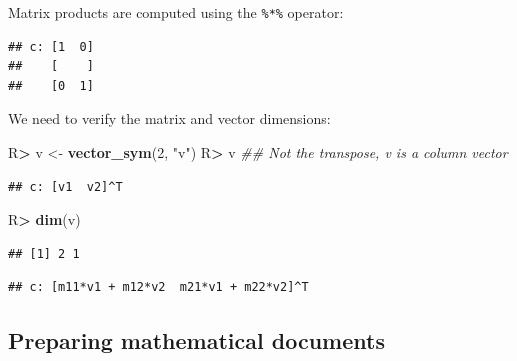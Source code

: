 \documentclass[10pt,]{article}
\newenvironment{Shaded}{\begin{snugshade}}{\end{snugshade}}
\newcommand{\CommentTok}[1]{\textcolor[rgb]{0.56,0.35,0.01}{\textit{#1}}}
\newcommand{\DecValTok}[1]{\textcolor[rgb]{0.00,0.00,0.81}{#1}}
\newcommand{\KeywordTok}[1]{\textcolor[rgb]{0.13,0.29,0.53}{\textbf{#1}}}
\newcommand{\NormalTok}[1]{#1}
\newcommand{\OperatorTok}[1]{\textcolor[rgb]{0.81,0.36,0.00}{\textbf{#1}}}
\newcommand{\StringTok}[1]{\textcolor[rgb]{0.31,0.60,0.02}{#1}}
\begin{document}
Matrix products are computed using the \texttt{\%*\%} operator:

\begin{Shaded}
\end{Shaded}

\begin{verbatim}
## c: [1  0]
##    [    ]
##    [0  1]
\end{verbatim}

We need to verify the matrix and vector dimensions:

\begin{Shaded}
\begin{Highlighting}[]
\NormalTok{R}\OperatorTok{>}\StringTok{ }\NormalTok{v <-}\StringTok{ }\KeywordTok{vector_sym}\NormalTok{(}\DecValTok{2}\NormalTok{, }\StringTok{"v"}\NormalTok{)}
\NormalTok{R}\OperatorTok{>}\StringTok{ }\NormalTok{v }\CommentTok{## Not the transpose, v is a column vector}
\end{Highlighting}
\end{Shaded}

\begin{verbatim}
## c: [v1  v2]^T
\end{verbatim}

\begin{Shaded}
\begin{Highlighting}[]
\NormalTok{R}\OperatorTok{>}\StringTok{ }\KeywordTok{dim}\NormalTok{(v)}
\end{Highlighting}
\end{Shaded}

\begin{verbatim}
## [1] 2 1
\end{verbatim}

\begin{Shaded}
\end{Shaded}

\begin{verbatim}
## c: [m11*v1 + m12*v2  m21*v1 + m22*v2]^T
\end{verbatim}

\hypertarget{sec:teaching}{%
\subsection{Preparing mathematical documents}\label{sec:teaching}}
\end{document}
